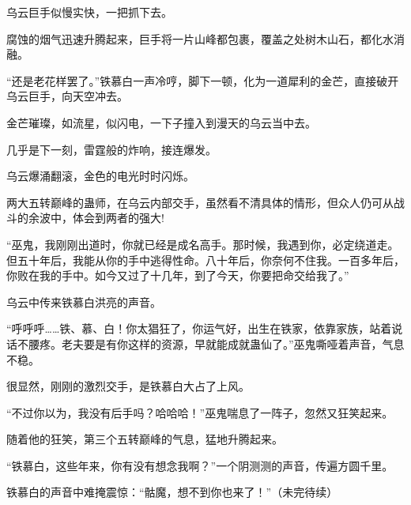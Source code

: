 \begin{this_body}
乌云巨手似慢实快，一把抓下去。

腐蚀的烟气迅速升腾起来，巨手将一片山峰都包裹，覆盖之处树木山石，都化水消融。

“还是老花样罢了。”铁慕白一声冷哼，脚下一顿，化为一道犀利的金芒，直接破开乌云巨手，向天空冲去。

金芒璀璨，如流星，似闪电，一下子撞入到漫天的乌云当中去。

几乎是下一刻，雷霆般的炸响，接连爆发。

乌云爆涌翻滚，金色的电光时时闪烁。

两大五转巅峰的蛊师，在乌云内部交手，虽然看不清具体的情形，但众人仍可从战斗的余波中，体会到两者的强大!

“巫鬼，我刚刚出道时，你就已经是成名高手。那时候，我遇到你，必定绕道走。但五十年后，我能从你的手中逃得性命。八十年后，你奈何不住我。一百多年后，你败在我的手中。如今又过了十几年，到了今天，你要把命交给我了。”

乌云中传来铁慕白洪亮的声音。

“呼呼呼……铁、慕、白！你太猖狂了，你运气好，出生在铁家，依靠家族，站着说话不腰疼。老夫要是有你这样的资源，早就能成就蛊仙了。”巫鬼嘶哑着声音，气息不稳。

很显然，刚刚的激烈交手，是铁慕白大占了上风。

“不过你以为，我没有后手吗？哈哈哈！”巫鬼喘息了一阵子，忽然又狂笑起来。

随着他的狂笑，第三个五转巅峰的气息，猛地升腾起来。

“铁慕白，这些年来，你有没有想念我啊？”一个阴测测的声音，传遍方圆千里。

铁慕白的声音中难掩震惊：“骷魔，想不到你也来了！”（未完待续）

\end{this_body}

